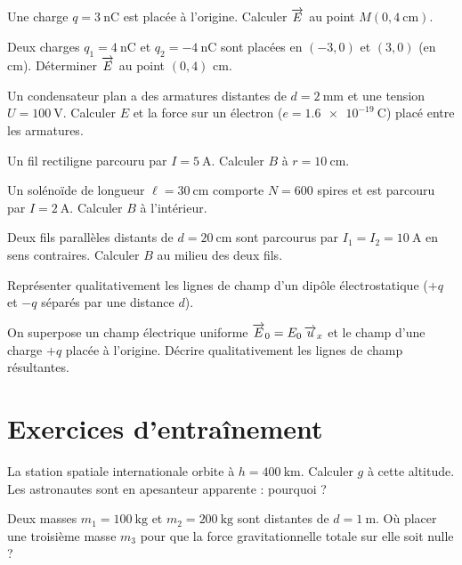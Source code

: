 

\exo{} Une charge $q = \SI{3}{\nano\coulomb}$ est placée à l’origine. Calculer $\overrightarrow{E}$ au point $M(0, \SI{4}{\centi\metre})$.

\exo{} Deux charges $q_1 = \SI{4}{\nano\coulomb}$ et $q_2 = \SI{-4}{\nano\coulomb}$ sont placées en $(-3,0)$ et $(3,0)$ (en cm). Déterminer $\overrightarrow{E}$ au point $(0,4)$ cm.

\exo{} Un condensateur plan a des armatures distantes de $d = \SI{2}{\milli\metre}$ et une tension $U = \SI{100}{\volt}$. Calculer $E$ et la force sur un électron ($e = \SI{1.6e-19}{\coulomb}$) placé entre les armatures.


\exo{} Un fil rectiligne parcouru par $I = \SI{5}{\ampere}$. Calculer $B$ à $r = \SI{10}{\centi\metre}$.

\exo{} Un solénoïde de longueur $\ell = \SI{30}{\centi\metre}$ comporte $N = 600$ spires et est parcouru par $I = \SI{2}{\ampere}$. Calculer $B$ à l’intérieur.

\exo{} Deux fils parallèles distants de $d = \SI{20}{\centi\metre}$ sont parcourus par $I_1 = I_2 = \SI{10}{\ampere}$ en sens contraires. Calculer $B$ au milieu des deux fils.


\exo{} Représenter qualitativement les lignes de champ d’un dipôle électrostatique ($+q$ et $-q$ séparés par une distance $d$).

\exo{} On superpose un champ électrique uniforme $\overrightarrow{E}_0 = E_0\,\overrightarrow{u}_x$ et le champ d’une charge $+q$ placée à l’origine. Décrire qualitativement les lignes de champ résultantes.

\section{Exercices d’entraînement}


\exo{} La station spatiale internationale orbite à $h = \SI{400}{\kilo\metre}$. Calculer $g$ à cette altitude. Les astronautes sont en apesanteur apparente : pourquoi ?

\exo{} Deux masses $m_1 = \SI{100}{\kilogram}$ et $m_2 = \SI{200}{\kilogram}$ sont distantes de $d = \SI{1}{\metre}$. Où placer une troisième masse $m_3$ pour que la force gravitationnelle totale sur elle soit nulle ?

